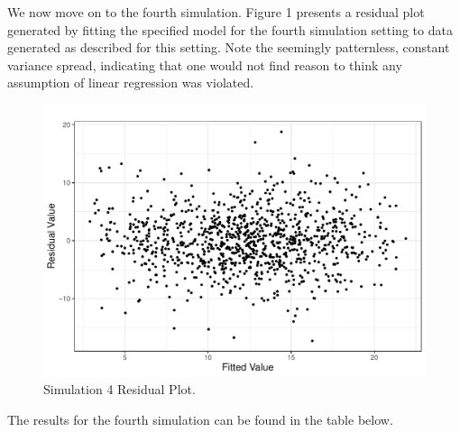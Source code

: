 \documentclass[submit]{smj}
\begin{document}
We now move on to the fourth simulation. Figure 1 presents a residual plot generated by fitting the specified model for the fourth simulation setting to data generated as described for this setting.
Note the seemingly patternless, constant variance spread, indicating that one would not find reason to think any assumption of linear regression was violated. 

\begin{figure}[H]
\includegraphics[width=4.5in]{figures/sim3_residual_plot.pdf}\par
\caption{Simulation 4 Residual Plot.}
\centering
\end{figure}

The results for the fourth simulation can be found in the table below.

\begin{table}[H]
	\centering
	\small\addtolength{\tabcolsep}{-3pt}
	\setlength\extrarowheight{-3pt}
	{
	}
	\end{table}
\end{document}
